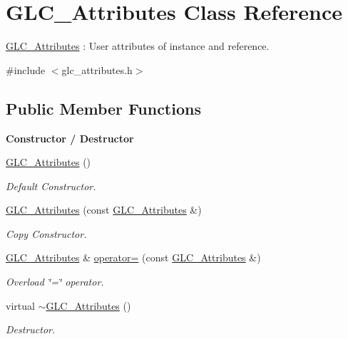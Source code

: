 \hypertarget{class_g_l_c___attributes}{\section{G\-L\-C\-\_\-\-Attributes Class Reference}
\label{class_g_l_c___attributes}
}


\hyperlink{class_g_l_c___attributes}{G\-L\-C\-\_\-\-Attributes} \-: User attributes of instance and reference.  




{\ttfamily \#include $<$glc\-\_\-attributes.\-h$>$}

\subsection*{Public Member Functions}
\begin{Indent}{\bf Constructor / Destructor}\par
\begin{DoxyCompactItemize}
\item 
\hyperlink{class_g_l_c___attributes_a80a7818bc9433e56d07b4c654fc95b0f}{G\-L\-C\-\_\-\-Attributes} ()
\begin{DoxyCompactList}\small\item\em Default Constructor. \end{DoxyCompactList}\item 
\hyperlink{class_g_l_c___attributes_aa2f4a5981b1281b76adf73a6631e4749}{G\-L\-C\-\_\-\-Attributes} (const \hyperlink{class_g_l_c___attributes}{G\-L\-C\-\_\-\-Attributes} \&)
\begin{DoxyCompactList}\small\item\em Copy Constructor. \end{DoxyCompactList}\item 
\hyperlink{class_g_l_c___attributes}{G\-L\-C\-\_\-\-Attributes} \& \hyperlink{class_g_l_c___attributes_ad17a1aabf6166e2322b336b2df19dfa1}{operator=} (const \hyperlink{class_g_l_c___attributes}{G\-L\-C\-\_\-\-Attributes} \&)
\begin{DoxyCompactList}\small\item\em Overload \char`\"{}=\char`\"{} operator. \end{DoxyCompactList}\item 
virtual \hyperlink{class_g_l_c___attributes_a425f814e5d901d4ce94b9d267b19d5ce}{$\sim$\-G\-L\-C\-\_\-\-Attributes} ()
\begin{DoxyCompactList}\small\item\em Destructor. \end{DoxyCompactList}\end{DoxyCompactItemize}
\end{Indent}
